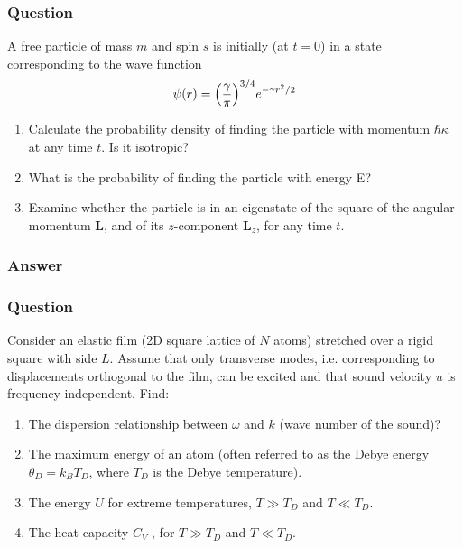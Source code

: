 \subsubsection{Question}
A free particle of mass $m$ and spin $s$ is initially (at $t = 0$) in a state corresponding to the wave function
\begin{equation*}
	\psi(r) = \qty(\frac{\gamma}{\pi})^{3/4}e^{-\gamma r^2/2}
\end{equation*}
\begin{enumerate}
	\item Calculate the probability density of finding the particle with momentum $\hbar\kappa$ at any time $t$. Is it isotropic?
	\item What is the probability of finding the particle with energy E?
	\item Examine whether the particle is in an eigenstate of the square of the angular momentum $\mathbf{L}$, and of its $z$-component $\mathbf{L}_z$, for any time $t$.
\end{enumerate}
\subsubsection{Answer}


\subsubsection{Question}
Consider an elastic film (2D square lattice of $N$ atoms) stretched over a rigid square with side $L$. Assume that only transverse modes, i.e. corresponding to displacements orthogonal to the film, can be excited and that sound velocity $u$ is frequency independent. Find:
\begin{enumerate}
	\item The dispersion relationship between $\omega$ and $k$ (wave number of the sound)? 
	\item The maximum energy of an atom (often referred to as the Debye energy $\theta_D = k_BT_D$, where $T_D$ is the Debye temperature).
	\item The energy $U$ for extreme temperatures, $T\gg T_D$ and $T\ll T_D$.
	\item The heat capacity $C_V$ , for $T\gg T_D$ and $T\ll T_D$.
\end{enumerate}
